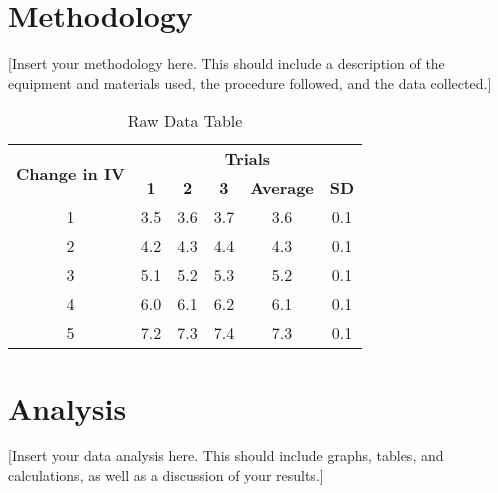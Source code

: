 \documentclass[12pt,a4paper]{article}
\begin{document}
\section{Methodology}
[Insert your methodology here. This should include a description of the equipment and materials used, the procedure followed, and the data collected.]

\begin{table}[ht]
\centering
\label{tab:rawdata}
\begin{tabular}{@{}cccccc@{}}
\toprule
\multirow{2}{*}{\textbf{Change in IV}} & \multicolumn{5}{c}{\textbf{Trials}} \\
\cmidrule(l){2-6}
& \textbf{1} & \textbf{2} & \textbf{3} & \textbf{Average} & \textbf{SD} \\
\midrule
1 & 3.5 & 3.6 & 3.7 & 3.6 & 0.1 \\
2 & 4.2 & 4.3 & 4.4 & 4.3 & 0.1 \\
3 & 5.1 & 5.2 & 5.3 & 5.2 & 0.1 \\
4 & 6.0 & 6.1 & 6.2 & 6.1 & 0.1 \\
5 & 7.2 & 7.3 & 7.4 & 7.3 & 0.1 \\
\bottomrule
\end{tabular}
\caption{Raw Data Table}
\end{table}

\section{Analysis}
[Insert your data analysis here. This should include graphs, tables, and calculations, as well as a discussion of your results.]
\\
\\
\begin{center}
\end{center}
\end{document}
